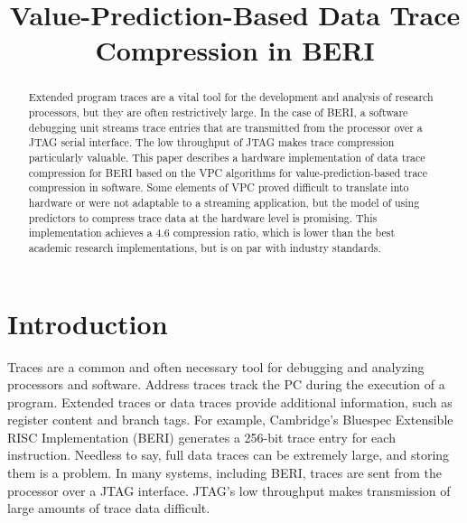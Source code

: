 \documentclass[conference]{IEEEtran}
\begin{document}
%
\title{Value-Prediction-Based Data Trace \\ Compression in BERI} 


\author{
}

\maketitle

\begin{abstract}
Extended program traces are a vital tool for the development and analysis of research processors, but they are often
restrictively large. In the case of BERI, a software debugging unit streams trace entries that are transmitted from the processor over
a JTAG serial interface. The low throughput of JTAG makes trace compression particularly valuable. 
This paper describes a hardware implementation of data trace compression for BERI based on the VPC algorithms for 
value-prediction-based trace compression in software. Some elements of VPC proved difficult to translate into hardware or were not adaptable to a streaming application, but the model of using predictors to compress trace data at the hardware level is promising. 
This implementation achieves a 4.6 compression ratio, which is lower than the best academic research implementations, but is
on par with industry standards.

\end{abstract}

\section{Introduction}
Traces are a common and often necessary tool for debugging and analyzing processors and software. Address traces track the PC during the execution of a program. Extended traces or data traces provide additional information, such as register content and branch tags. For example, Cambridge's Bluespec Extensible RISC Implementation (BERI) \cite{beri} generates a 256-bit trace entry for each instruction. Needless to say, full data traces can be extremely large, and storing them is a problem. In many systems, including BERI, traces are sent from the processor over a JTAG interface. JTAG's low throughput makes transmission of large amounts of trace data difficult. 
\end{document}
